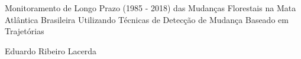 \documentclass[12pt,a4paper]{article}
\begin{document}

\begin{titlepage}
    \centering
    \vspace*{\fill}

    \vspace*{0.5cm}

    \Large%
    Monitoramento de Longo Prazo (1985 - 2018) das Mudanças Florestais na Mata Atlântica Brasileira Utilizando Técnicas de Detecção de Mudança Baseado em Trajetórias

    \vspace*{5cm}

    \large Eduardo Ribeiro Lacerda

    \vspace*{\fill}
\end{titlepage}

\newpage
\tableofcontents

\newpage
\listoffigures
\newpage


\newpage


\newpage


\newpage


\newpage


%


\newpage


\newpage

\end{document}
